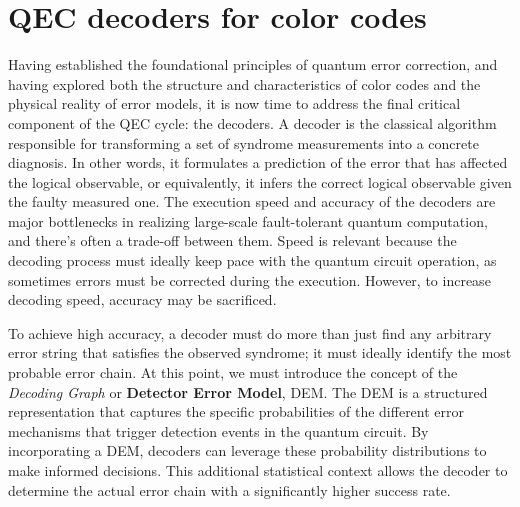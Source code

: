 \chapter{QEC decoders for color codes}
\label{chap:qec_decoders}

Having established the foundational principles of quantum error correction, and having explored both the structure and characteristics of color codes and the physical reality of error models, it is now time to address the final critical component of the QEC cycle: the decoders. A decoder is the classical algorithm responsible for transforming a set of syndrome measurements into a concrete diagnosis. In other words, it formulates a prediction of the error that has affected the logical observable, or equivalently, it infers the correct logical observable given the faulty measured one. The execution speed and accuracy of the decoders are major bottlenecks in realizing large-scale fault-tolerant quantum computation, and there's often a trade-off between them. Speed is relevant because the decoding process must ideally keep pace with the quantum circuit operation, as sometimes errors must be corrected during the execution. However, to increase decoding speed, accuracy may be sacrificed. 

 To achieve high accuracy, a decoder must do more than just find any arbitrary error string that satisfies the observed syndrome; it must ideally identify the most probable error chain. At this point, we must introduce the concept of the \textit{Decoding Graph} or \textbf{Detector Error Model}, DEM. The DEM is a structured representation that captures the specific probabilities of the different error mechanisms that trigger detection events in the quantum circuit. By incorporating a DEM, decoders can leverage these probability distributions to make informed decisions. This additional statistical context allows the decoder to determine the actual error chain with a significantly higher success rate.

